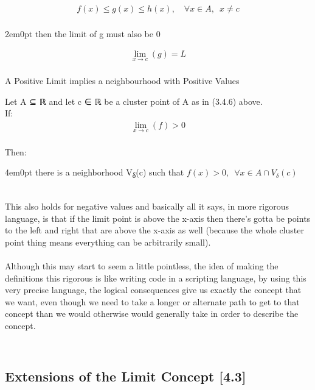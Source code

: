 \[\begin{aligned} f\left( x
\right) \leq g\left( x
\right) \leq h\left( x
\right), \quad \forall
x\in A, \enspace x\neq c
\label{squeezelimdist}\end{aligned}\]\\

2em0pt {then} the limit of g must also be 0

\[\begin{aligned}
\lim_{x\rightarrow
c}\left( g \right)=L
\label{limisL}\end{aligned}\]\\

A Positive Limit implies a neighbourhood with Positive
Values\protect\hypertarget{a-positive-limit-implies-a-neighbourhood-with-positive-values}{}{}

Let {A} ⊆ ℝ and let {c} ∈ ℝ be a cluster point of {A} as in (3.4.6)
above.\\
{If}:\\
\[\begin{aligned}
\lim_{x\rightarrow
c}\left( f \right) > 0
\label{limneighbourpor}\end{aligned}\]\\

{Then:}

4em0pt there is a neighborhood {V}\textsubscript{{δ}}({c}) such that
\(f\left( x \right) >0, \enspace \forall x \in A \cap V_{\delta}\left( c \right)\)

~\\
This also holds for negative values and basically all it says, in more
rigorous language, is that if the limit point is above the {x}-axis then
there's gotta be points to the left and right that are above the
{x}-axis as well (because the whole cluster point thing means everything
can be arbitrarily small).\\
~\\
Although this may start to seem a little pointless, the idea of making
the definitions this rigorous is like writing code in a scripting
language, by using this very precise language, the logical consequences
give us exactly the concept that we want, even though we need to take a
longer or alternate path to get to that concept than we would otherwise
would generally take in order to describe the concept.

\hypertarget{extensions-of-the-limit-concept-4.3}{%
\subsection[\hfill\break
Extensions of the Limit Concept
{[}4.3{]}]{\texorpdfstring{\protect\hypertarget{SECTION00013000000000000000}{}{}\protect\hypertarget{extensions-of-the-limit-concept-4.3}{}{}~\\
Extensions of the Limit Concept
{[}4.3{]}}{ Extensions of the Limit Concept {[}4.3{]}}}\label{extensions-of-the-limit-concept-4.3}}

